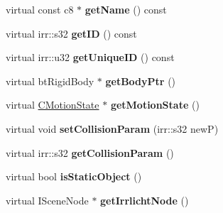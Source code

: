 \begin{DoxyCompactItemize}
\item 
\hypertarget{class_c_irr_b_p_rigid_body_a3f7b533714e171a3b2a3cfd6de454445}{
virtual const c8 $\ast$ {\bfseries getName} () const }
\label{class_c_irr_b_p_rigid_body_a3f7b533714e171a3b2a3cfd6de454445}

\item 
\hypertarget{class_c_irr_b_p_rigid_body_acfa13927cb5724c6c0d81ab82b531002}{
virtual irr::s32 {\bfseries getID} () const }
\label{class_c_irr_b_p_rigid_body_acfa13927cb5724c6c0d81ab82b531002}

\item 
\hypertarget{class_c_irr_b_p_rigid_body_a57a51d307201ec99615a0ca623daf0a1}{
virtual irr::u32 {\bfseries getUniqueID} () const }
\label{class_c_irr_b_p_rigid_body_a57a51d307201ec99615a0ca623daf0a1}

\item 
\hypertarget{class_c_irr_b_p_rigid_body_a3e4f7b3000b5955bd8731be4104d963a}{
virtual btRigidBody $\ast$ {\bfseries getBodyPtr} ()}
\label{class_c_irr_b_p_rigid_body_a3e4f7b3000b5955bd8731be4104d963a}

\item 
\hypertarget{class_c_irr_b_p_rigid_body_a1242a37feff707d535c66508afc4bc7f}{
virtual \hyperlink{class_c_motion_state}{CMotionState} $\ast$ {\bfseries getMotionState} ()}
\label{class_c_irr_b_p_rigid_body_a1242a37feff707d535c66508afc4bc7f}

\item 
\hypertarget{class_c_irr_b_p_rigid_body_a50a3138ce669e02f8e7abc1af212b5f6}{
virtual void {\bfseries setCollisionParam} (irr::s32 newP)}
\label{class_c_irr_b_p_rigid_body_a50a3138ce669e02f8e7abc1af212b5f6}

\item 
\hypertarget{class_c_irr_b_p_rigid_body_a2ac9d5458805ae111b2ab2ebf6baec74}{
virtual irr::s32 {\bfseries getCollisionParam} ()}
\label{class_c_irr_b_p_rigid_body_a2ac9d5458805ae111b2ab2ebf6baec74}

\item 
\hypertarget{class_c_irr_b_p_rigid_body_ad0db19bf9575c316e235eb669d499084}{
virtual bool {\bfseries isStaticObject} ()}
\label{class_c_irr_b_p_rigid_body_ad0db19bf9575c316e235eb669d499084}

\item 
\hypertarget{class_c_irr_b_p_rigid_body_ac15067d38996295fbe1ea274ec8d245f}{
virtual ISceneNode $\ast$ {\bfseries getIrrlichtNode} ()}
\label{class_c_irr_b_p_rigid_body_ac15067d38996295fbe1ea274ec8d245f}


\end{DoxyCompactItemize}
